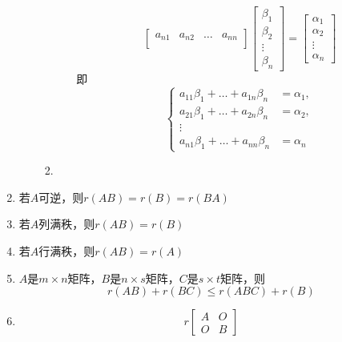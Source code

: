 \documentclass[a4paper,12pt]{article}
\begin{document}
\begin{enumerate}
\begin{enumerate}
\begin{enumerate}
\begin{itemize}
\[\begin{bmatrix}
                            a_{n1} & a_{n2} & \dots & a_{nn} \\
                        \end{bmatrix}
                        \begin{bmatrix}
                            \beta_1 \\ \beta_2 \\ \vdots \\ \beta_n
                        \end{bmatrix}
                        =
                        \begin{bmatrix}
                            \alpha_1 \\ \alpha_2 \\ \vdots \\ \alpha_n
                        \end{bmatrix}
                    \]
                    即
                    \[
                        \begin{cases}
                            a_{11}\beta_1 + \dots + a_{1n}\beta_n &= \alpha_1, \\
                            a_{21}\beta_1 + \dots + a_{2n}\beta_n &= \alpha_2, \\
                            \vdots & \\
                            a_{n1}\beta_1 + \dots + a_{nn}\beta_n &= \alpha_n
                        \end{cases}
                    \]
                \end{itemize}
                \item {\color[rgb]{0.2, 0.6, 0.3}{矩阵$C(AB)$的列向量可由$A$的列向量线性表出}}
            \end{enumerate}
        \end{enumerate}
        \item 若$A$可逆，则$r(AB) = r(B) = r(BA)$
        \item 若$A$列满秩，则$r(AB) = r(B)$
        \item 若$A$行满秩，则$r(AB) = r(A)$
        \item $A$是$m \times n$矩阵，$B$是$n \times s$矩阵，$C$是$s \times t$矩阵，则
        \[
            r(AB) + r(BC) \le r(ABC) + r(B)
        \]
        \item
        \[
            r\!\begin{bmatrix}
                   A & O \\
                   O & B
            \end{bmatrix}
\]
\end{enumerate}
\end{document}
